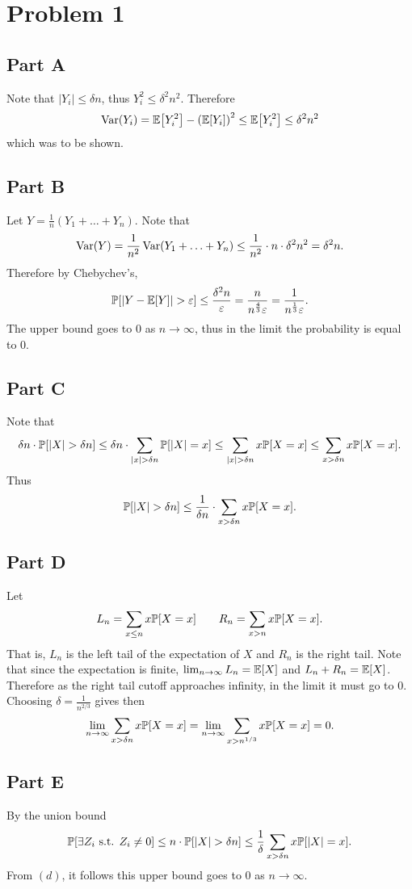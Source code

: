 \documentclass{eeleyes}
\begin{document}
\section*{Problem 1}
\subsection*{Part A}
Note that $|Y_i| \leq \delta n$, thus $Y_i^2 \leq \delta^2 n^2$. Therefore
\[
    \varr(Y_i) = \expp{Y_i^2} - \qty(\expp{Y_i})^2 \leq \expp{Y_i^2} \leq \delta^2 n^2
\]
which was to be shown.

\subsection*{Part B}
Let $Y = \frac{1}{n}(Y_1 + \ldots + Y_n)$. Note that
\[
    \operatorname{Var}(Y) = \frac{1}{n^2} \operatorname{Var}(Y_1 + \ldots + Y_n) \leq \frac{1}{n^2} \cdot n \cdot \delta^2 n^2 = \delta^2 n
.\]
Therefore by Chebychev's,
\[
    \prob{|Y - \expp{Y}| > \eps} \leq \frac{\delta^2 n}{\eps} 
    = \frac{n}{n^{\frac{4}{3}} \eps} 
    = \frac{1}{n^{\frac{1}{3}} \eps}
.\]
The upper bound goes to $0$ as $n \to \infty$, thus in the limit the probability is equal to $0$.

\subsection*{Part C}
Note that
\[
    \delta n \cdot \prob{|X| > \delta n} \leq \delta n \cdot \sum_{|x| > \delta n} \prob{|X| = x} \leq \sum_{|x| > \delta n} x \prob{X = x} \leq \sum_{x > \delta n} x \prob{X = x}
.\]
Thus
\[
    \prob{|X| > \delta n} \leq \frac{1}{\delta n} \cdot\sum_{x > \delta n} x \prob{X = x}
.\]

\subsection*{Part D}
Let
\[
    L_n = \sum_{x \leq n} x \prob{X = x} \quad\quad R_n = \sum_{x > n} x \prob{X = x}
.\]
That is, $L_n$ is the left tail of the expectation of $X$ and $R_n$ is the right tail. Note that since the expectation is finite, $\lim_{n\to \infty} L_n = \expp{X}$ and $L_n + R_n = \expp{X}$. Therefore as the right tail cutoff approaches infinity, in the limit it must go to $0$. Choosing $\delta = \frac{1}{n^{2 / 3}}$ gives then
\[
    \lim_{n \to \infty} \sum_{x > \delta n} x \prob{X = x} = \lim_{n \to \infty} \sum_{x > n^{1/3}} x \prob{X = x} = 0
.\]

\subsection*{Part E}
By the union bound
\[
    \prob{\exists Z_i \text{ s.t. } Z_i \neq 0} \leq n \cdot \prob{|X| > \delta n} \leq \frac{1}{\delta} \sum_{x > \delta n} x \prob{|X| = x}
.\]
From $(d)$, it follows this upper bound goes to $0$ as $n \to \infty$.
\end{document}
